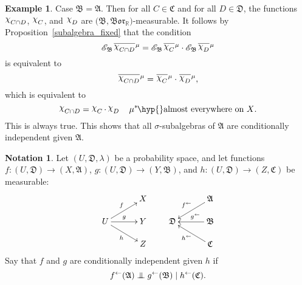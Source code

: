 \documentclass[
twoside=true,
paper=letter,
fontsize=9pt,
pagesize=auto,
leqno,
openany,
headsepline,
overfullrule,
]{scrbook}
\theoremstyle{plain}
\theoremstyle{plain}
\theoremstyle{definition}
\newtheorem{example}[thm]{Example}
\newtheorem{notn}[thm]{Notation}
\theoremstyle{bfnoteitalic}
\theoremstyle{bfnoteroman}
\newcommand{\sigalg}[1]{\mathfrak{#1}}
\newcommand{\cali}[1]{\mathscr{#1}}
\newcommand{\condexpsub}[2]
{\mathop{\cali{E}\hspace{-1.5pt}}\nolimits_{#2}\hspace{-1pt}#1}
\newcommand{\borel}{\mathfrak{Bor}}
\newcommand{\textsigma}{\hbox{\large{$\sigma$}}\kern-1pt}
\newcommand{\charfunction}[1]{\mathop{{\raisebox{2pt}{$\chi$}}_{#1}}}
\newcommand{\preimage}[1]{\mathop{#1^{\leftarrow}}}
\newcommand{\R}{\mathbb{R}}
\newcommand{\meets}{\cap}
\newcommand{\sigmaalgebra}{\sigalg{A}}
\newcommand{\sigmaalgebraii}{\sigalg{B}}
\newcommand{\sigmaalgebraiii}{\sigalg{C}}
\newcommand{\sigmaalgebraiv}{\sigalg{D}}
\newcommand{\kernast}{\ast\kern-1pt}
\newcommand{\funcf}{f}
\newcommand{\funcg}{g}
\newcommand{\funch}{h}
\newcommand{\function}{f}
\newcommand{\functionii}{g}
\newcommand{\functioniii}{h}
\newcommand{\measurespace}{X}
\newcommand{\measurespaceii}{Y}
\newcommand{\measurespaceiii}{Z}
\newcommand{\measure}{\mu}
\newcommand{\measureiii}{\lambda}
\newcommand{\setiii}{C}
\newcommand{\setiv}{D}
\newcommand{\uspace}{U}%
\newcommand{\uspacesig}{\sigalg{D}}
\newcommand{\condindep}[3]{#1\perp\kern-6pt\perp #2\mid #3}
\newcommand*\xbar[1]{%
   \hbox{%
     \vbox{%
       \hrule height 0.4pt %
       \kern0.4ex%
       \hbox{%
         \ensuremath{#1}%
       }%
     }%
   }%
}
\newcommand{\lebclass}[1]{\hspace{.5pt}\xbar{#1}\hspace{0.5pt}}
\newcommand{\ellclass}[2]{\lebclass{#1}^{#2}}
\begin{document}
\begin{example}
Case $\sigmaalgebraii = \sigmaalgebra$.
Then for all $\setiii\in\sigmaalgebraiii$ and for all $\setiv\in\sigmaalgebraiv$,
the functions
$\charfunction{\setiii\meets\setiv}$, $\charfunction{\setiii}$,
and $\charfunction{\setiv}$ are
$\bigl( \sigmaalgebraii, \borel_\R \bigr)$\hyp{}measurable.
It follows by Proposition~\ref{subalgebra_fixed} that the condition
\[
\condexpsub{\ellclass{\charfunction{\setiii\meets\setiv}}{\measure}}{\sigmaalgebraii}
=
\condexpsub{\ellclass{\charfunction{\setiii}}{\measure}}{\sigmaalgebraii}
\cdot
\condexpsub{\ellclass{\charfunction{\setiv}}{\measure}}{\sigmaalgebraii}
\]
is equivalent to
\[
\ellclass{\charfunction{\setiii\meets\setiv}}{\measure}
=
\ellclass{\charfunction{\setiii}}{\measure}
\cdot
\ellclass{\charfunction{\setiv}}{\measure},
\]
which is equivalent to
\[
\charfunction{\setiii\meets\setiv}
=
\charfunction{\setiii}
\cdot
\charfunction{\setiv}
\quad\text{$\measure^\kernast$\hyp{}almost everywhere on $\measurespace$.}
\]
This is always true.
This shows that all \textsigma\hyp{}subalgebras of $\sigmaalgebra$ are conditionally independent given $\sigmaalgebra$.
\end{example}






\begin{notn}\label{conditionally_independent_functions}
Let
$(\uspace,\uspacesig,\measureiii)$
be a probability space, and let functions
$\function:(\uspace,\uspacesig)\to (\measurespace,\sigmaalgebra)$,
$\functionii:(\uspace,\uspacesig)\to (\measurespaceii,\sigmaalgebraii)$,
and
$\functioniii:(\uspace,\uspacesig)\to (\measurespaceiii,\sigmaalgebraiii)$
be measurable:
\[
\xymatrix@R=14pt@C=30pt{
 & \measurespace \\
 \uspace
 \ar[ur]^\function
 \ar[r]^\functionii
 \ar[dr]_\functioniii
 & \measurespaceii\\
 & \measurespaceiii \\
}
%
\qquad
%
\xymatrix@R=14pt@C=30pt{
 & \sigmaalgebra \ar[dl]_{\preimage{\function}} \\
 \uspacesig & \sigmaalgebraii \ar[l]_-{\quad \preimage{\functionii}}\\
 & \sigmaalgebraiii \ar[ul]^{\preimage{\functioniii}}\\
}
\]
Say that $\funcf$ and $\funcg$ are conditionally independent
given $\funch$ if
\[
\condindep{\preimage{\funcf}(\sigmaalgebra)}{\preimage{\funcg}(\sigmaalgebraii)}
{\preimage{\funch}(\sigmaalgebraiii)}.
\]
\end{notn}
\end{document}
